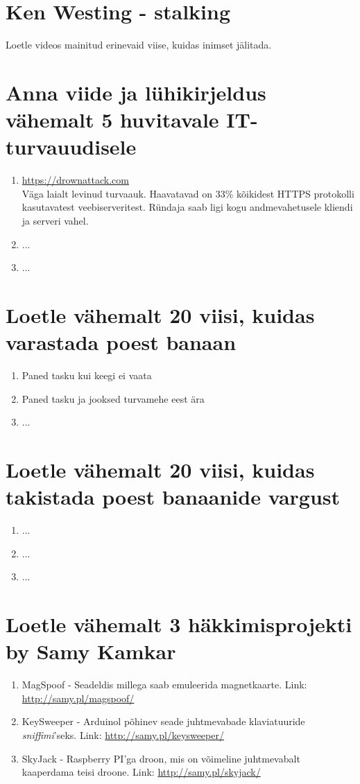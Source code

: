\documentclass{article}
\begin{document}
\section{Ken Westing - stalking}
Loetle videos mainitud erinevaid viise, kuidas inimset jälitada.

\section{Anna viide ja lühikirjeldus vähemalt 5 huvitavale IT-turvauudisele}
\begin{enumerate}
	\item{\url{https://drownattack.com}\\
		Väga laialt levinud turvaauk. Haavatavad on 33\% kõikidest HTTPS protokolli kasutavatest veebiserveritest. 
		Ründaja saab ligi kogu andmevahetusele kliendi ja serveri vahel.}
	\item{...}
	\item{...}
\end{enumerate}

\section{Loetle vähemalt 20 viisi, kuidas varastada poest banaan}
\begin{enumerate}
	\item{Paned tasku kui keegi ei vaata}
	\item{Paned tasku ja jooksed turvamehe eest ära}
	\item{...}
\end{enumerate}

\section{Loetle vähemalt 20 viisi, kuidas takistada poest banaanide vargust}
\begin{enumerate}
	\item{...}
	\item{...}
	\item{...}
\end{enumerate}

\section{Loetle vähemalt 3 häkkimisprojekti by Samy Kamkar}
\begin{enumerate}
	\item{MagSpoof - Seadeldis millega saab emuleerida magnetkaarte. Link: \url{http://samy.pl/magspoof/}}
	\item{KeySweeper - Arduinol põhinev seade juhtmevabade klaviatuuride \textit{sniffimi}'seks. Link: \url{http://samy.pl/keysweeper/}}
	\item{SkyJack - Raspberry PI'ga droon, mis on võimeline juhtmevabalt kaaperdama teisi droone. Link: \url{http://samy.pl/skyjack/}}
\end{enumerate}
\end{document}
